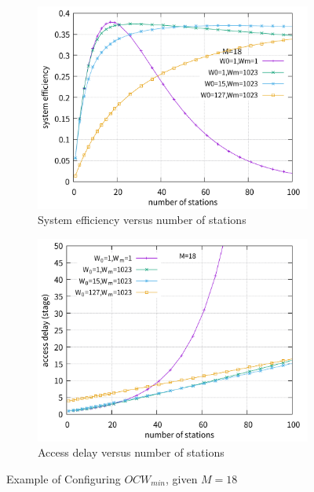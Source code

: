 \documentclass[journal]{IEEEtran}
\begin{document}
\begin{figure}[!t]
\centering
\begin{subfigure}{0.5\textwidth}  
  \centering  
  \includegraphics[scale=0.38]{./figure/Section_perf_eval/Wm/n_eff_perf_Wm1023.pdf}  
    \caption{System efficiency versus number of stations}   
    \label{fig_n_eff_W0}
\end{subfigure}   

\begin{subfigure}{0.5\textwidth}
	\centering
\includegraphics[scale=.38]{./figure/Section_perf_eval/Wm/n_delay_perf_Wm1023.pdf}
\caption{Access delay versus number of stations}
\label{fig_n_delay_W0}
\end{subfigure}
\caption{Example of Configuring $OCW_{min}$, given $M=18$}
\label{fig_W0}
\end{figure}
\end{document}
